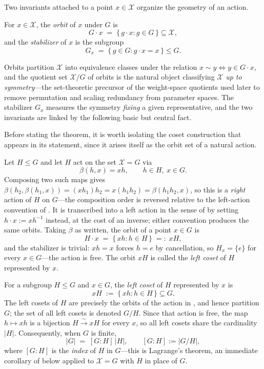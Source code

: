 \documentclass[mathematics,review,submit,moreauthors]{Definitions/mdpi}
\begin{document}
Two invariants attached to a point $x \in \mathcal{X}$ organize the geometry of an
action.

\begin{Definition}
\label{def:orbit-stabilizer}
For $x \in \mathcal{X}$, the \emph{orbit} of $x$ under $G$ is
\[
    G \cdot x \;=\; \{\, g \cdot x : g \in G \,\} \subseteq \mathcal{X},
\]
and the \emph{stabilizer} of $x$ is the subgroup
\[
    G_x \;=\; \{\, g \in G : g \cdot x = x \,\} \leq G.
\]
\end{Definition}

Orbits partition $\mathcal{X}$ into equivalence classes under the relation
$x \sim y \iff y \in G \cdot x$, and the quotient set $\mathcal{X} / G$ of orbits is
the natural object classifying $\mathcal{X}$ \emph{up to symmetry}---the set-theoretic
precursor of the weight-space quotients used later to remove permutation and
scaling redundancy from parameter spaces. The stabilizer $G_x$ measures the
symmetry \emph{fixing} a given representative, and the two invariants are
linked by the following basic but central fact.

Before stating the theorem, it is worth isolating the coset construction
that appears in its statement, since it arises itself as the orbit set of a
natural action.

\begin{Example}
\label{ex:cosets-as-orbits}
Let $H \leq G$ and let $H$ act on the set $\mathcal{X} = G$ via
\[
    \beta(h,x) = x h, \qquad h \in H,\ x \in G.
\]
Composing two such maps gives $\beta(h_2, \beta(h_1,x)) = (x h_1) h_2 = x(h_1 h_2) = \beta(h_1 h_2, x)$,
so this is a \emph{right} action of $H$ on $G$---the composition order is
reversed relative to the left-action convention of
. It is transcribed into a left action in
the sense of  by setting
$h \cdot x := x h^{-1}$ instead, at the cost of an inverse; either
convention produces the same orbits. Taking $\beta$ as written, the orbit of
a point $x \in G$ is
\[
    H \cdot x \;=\; \{\, xh : h \in H \,\} \;=:\; xH,
\]
and the stabilizer is trivial: $xh = x$ forces $h = e$ by cancellation, so
$H_x = \{e\}$ for every $x \in G$---the action is free. The orbit $xH$ is
called the \emph{left coset} of $H$ represented by $x$.
\end{Example}

\begin{Definition}
\label{def:left-coset}
For a subgroup $H \leq G$ and $x \in G$, the \emph{left coset} of $H$
represented by $x$ is
\[
    xH \;:=\; \{\, xh : h \in H \,\} \subseteq G.
\]
The left cosets of $H$ are precisely the orbits of the action in
, and hence partition $G$; the set of all
left cosets is denoted $G/H$. Since that action is free, the map
$h \mapsto xh$ is a bijection $H \xrightarrow{\sim} xH$ for every $x$, so all
left cosets share the cardinality $|H|$. Consequently, when $G$ is finite,
\[
    |G| \;=\; [G:H]\,|H|, \qquad [G:H] := |G/H|,
\]
where $[G:H]$ is the \emph{index} of $H$ in $G$---this is Lagrange's
theorem, an immediate corollary of  below
applied to $\mathcal{X} = G$ with $H$ in place of $G$.
\end{Definition}
\end{document}
